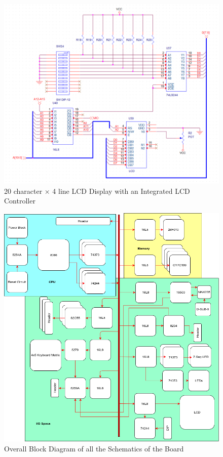 \begin{appendices}
        \begin{figure}[ht]
            \begin{center}
                \includegraphics[width=1\textwidth]{figures/schematics/lcd.png}
                \caption{20 character $\times$ 4 line LCD Display with an Integrated LCD Controller} \label{fig:page11}
            \end{center}
        \end{figure}

        \begin{figure}[ht]
            \begin{center}
                \includegraphics[width=1\textwidth]{figures/block_diagram.png}
                \caption{Overall Block Diagram of all the Schematics of the Board} \label{fig:block_diagram}
            \end{center}
        \end{figure}



\end{appendices}
